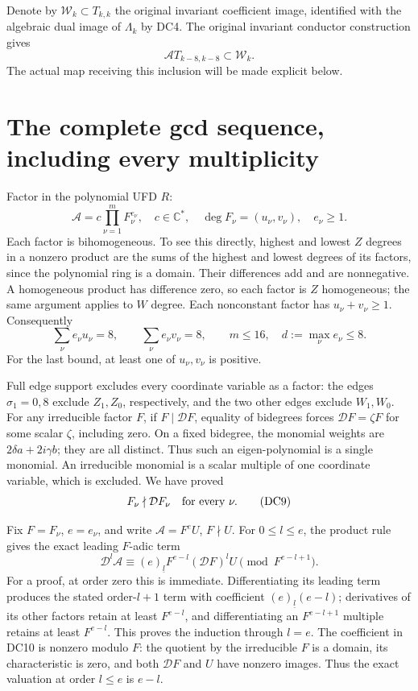 \documentclass[11pt]{article}
\newcommand{\C}{\mathbb C}
\begin{document}
Denote by $\mathcal W_k\subset T_{k,k}$ the original invariant
coefficient image, identified with the algebraic dual image of
$\Lambda_k$ by DC4.  The original invariant conductor construction
gives
\[
 \mathcal A T_{k-8,k-8}\subset\mathcal W_k.                       \tag{DC6}
\]
The actual map receiving this inclusion will be made explicit below.

\section{The complete gcd sequence, including every multiplicity}
Factor in the polynomial UFD $R$:
\[
 \mathcal A=c\prod_{\nu=1}^{m}F_\nu^{e_\nu},\quad
 c\in\C^*,\quad \deg F_\nu=(u_\nu,v_\nu),
 \quad e_\nu\ge1.                                               \tag{DC7}
\]
Each factor is bihomogeneous.  To see this directly, highest and
lowest $Z$ degrees in a nonzero product are the sums of the highest
and lowest degrees of its factors, since the polynomial ring is a
domain.  Their differences add and are nonnegative.  A homogeneous
product has difference zero, so each factor is $Z$ homogeneous;
the same argument applies to $W$ degree.  Each nonconstant factor has
$u_\nu+v_\nu\ge1$.  Consequently
\[
 \sum_\nu e_\nu u_\nu=8,\qquad
 \sum_\nu e_\nu v_\nu=8,\qquad m\le16,
 \quad d:=\max_\nu e_\nu\le8.                                   \tag{DC8}
\]
For the last bound, at least one of $u_\nu,v_\nu$ is positive.

Full edge support excludes every coordinate variable as a factor:
the edges $\sigma_1=0,8$ exclude $Z_1,Z_0$, respectively, and the
two other edges exclude $W_1,W_0$.  For any irreducible factor $F$, if
$F\mid\mathcal DF$, equality of bidegrees forces
$\mathcal DF=\zeta F$ for some scalar $\zeta$, including zero.
On a fixed bidegree, the monomial weights are
$2\delta a+2i\gamma b$; they are all distinct.  Thus such an
eigen-polynomial is a single monomial.  An irreducible monomial is
a scalar multiple of one coordinate variable, which is excluded.
We have proved
\[
 F_\nu\nmid\mathcal D F_\nu\quad\hbox{for every }\nu.           \tag{DC9}
\]

Fix $F=F_\nu$, $e=e_\nu$, and write $\mathcal A=F^e U$, $F\nmid U$.
For $0\le l\le e$, the product rule gives the exact leading
$F$-adic term
\[
 \mathcal D^l\mathcal A
 \equiv (e)_{\underline l}F^{e-l}(\mathcal DF)^l U
                          \pmod {F^{e-l+1}}.                    \tag{DC10}
\]
For a proof, at order zero this is immediate.  Differentiating its
leading term produces the stated order-$l+1$ term with coefficient
$(e)_{\underline l}(e-l)$; derivatives of its other factors retain
at least $F^{e-l}$, and differentiating an $F^{e-l+1}$ multiple
retains at least $F^{e-l}$.  This proves the induction through $l=e$.
The coefficient in DC10 is nonzero modulo $F$: the quotient by the
irreducible $F$ is a domain, its characteristic is zero, and both
$\mathcal DF$ and $U$ have nonzero images.  Thus the exact valuation
at order $l\le e$ is $e-l$.
\end{document}
